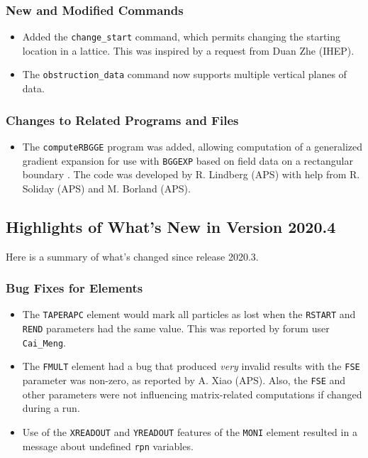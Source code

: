 \documentclass[11pt]{article}
\begin{document}
\subsubsection{New and Modified Commands}
\begin{itemize}
\item Added the \verb|change_start| command, which permits changing the starting location in a lattice.
  This was inspired by a request from Duan Zhe (IHEP).
\item The \verb|obstruction_data| command now supports multiple vertical planes of data.
\end{itemize}

\subsubsection{Changes to Related Programs and Files}

\begin{itemize}
\item The \verb|computeRBGGE| program was added, allowing computation of a generalized gradient expansion\cite{Venturini-NIMA427-387} for
  use with \verb|BGGEXP| based on field data on a rectangular boundary \cite{Mitchell-2007}. The code was developed by R. Lindberg (APS)
  with help from R. Soliday (APS) and M. Borland (APS).
\end{itemize}

\subsection{Highlights of What's New in Version 2020.4}

Here is a summary of what's changed since release 2020.3.

\subsubsection{Bug Fixes for Elements}

\begin{itemize}
\item The \verb|TAPERAPC| element would mark all particles as lost when the \verb|RSTART| and \verb|REND| parameters
  had the same value. This was reported by forum user \verb|Cai_Meng|.
\item The \verb|FMULT| element had a bug that produced {\em very} invalid results with the \verb|FSE| parameter was non-zero,
  as reported by A. Xiao (APS). Also, the \verb|FSE| and other parameters were not influencing matrix-related computations
  if changed during a run.
\item Use of the \verb|XREADOUT| and \verb|YREADOUT| features of the \verb|MONI| element resulted in a message about
  undefined \verb|rpn| variables.
\end{itemize}
\end{document}
